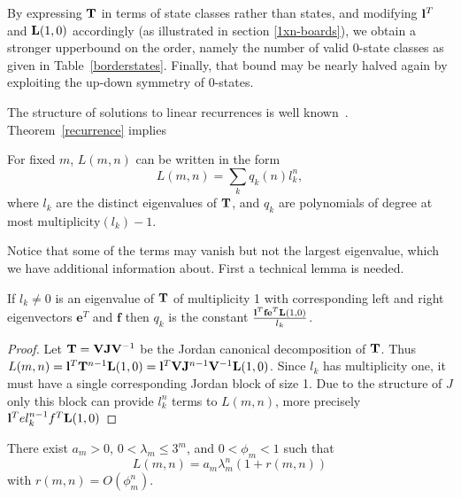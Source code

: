 \documentclass{article}
\begin{document}
By expressing $\mathbf{T}$ in terms of state classes rather than states,
and modifying $\mathbf{l}^T$ and $\mathbf{L}(1,0)$ accordingly
(as illustrated in section \ref{1xn-boards}),
we obtain a stronger upperbound on the order, namely the number of valid
$0$-state classes as given in Table~\ref{borderstates}.
Finally, that bound may be nearly halved again by exploiting the up-down
symmetry of $0$-states.

The structure of solutions to linear recurrences
is well known~\cite{concretemath}.
Theorem~\ref{recurrence} implies

\begin{coro}
  \label{explicit-form}
  For fixed $m$, $L(m,n)$ can be written in the form
  \[
    L(m,n) = \sum_k q_k(n) l_k^n,
  \]
  where $l_k$ are the distinct eigenvalues of $\mathbf{T}$, and $q_k$ are
  polynomials of degree at most $\mbox{multiplicity}(l_k)-1$. 
\end{coro}

Notice that some of the terms may vanish but not the largest
eigenvalue, which we have additional information about. First a
technical lemma is needed.

\begin{lemma}
  \label{jordan-lemma}
  If $l_k \ne 0$ is an eigenvalue of $\mathbf{T}$ of multiplicity 1 with
  corresponding left and right eigenvectors $\mathbf{e}^T$ and
  $\mathbf{f}$ then $q_k$ is the constant $\frac{\mathbf{l}^T \mathbf{f}
    \mathbf{e}^T \mathbf{L}(1,0)}{l_k}$.
\end{lemma}

\begin{proof}
  Let $\mathbf{T} = \mathbf{V} \mathbf{J} \mathbf{V}^{-1}$ be the Jordan
  canonical decomposition of $\mathbf{T}$. Thus $L(m,n) = \mathbf{l}^T \mathbf{T}^{n-1}
  \mathbf{L}(1,0) = \mathbf{l}^T \mathbf{V} \mathbf{J}^{n-1} \mathbf{V}^{-1}
  \mathbf{L}(1,0)$. Since $l_k$ has multiplicity one, it must have a single
  corresponding Jordan block of size 1. Due to the structure of $J$
  only this block can provide $l_k^n$ terms to $L(m,n)$, more
  precisely $\mathbf{l}^T e l_k^{n-1} f^T \mathbf{L}(1,0)$
\end{proof}


\begin{theorem}
\label{mxn-asymptotics}
  There exist $a_m>0$, $0<\lambda_m \leq 3^m$, and $0<\phi_m<1$ such that
  \[ L(m,n)=a_m \lambda_m^n (1+r(m,n)) \]
  with $r(m,n)=O(\phi_m^n)$.
\end{theorem}
\end{document}
